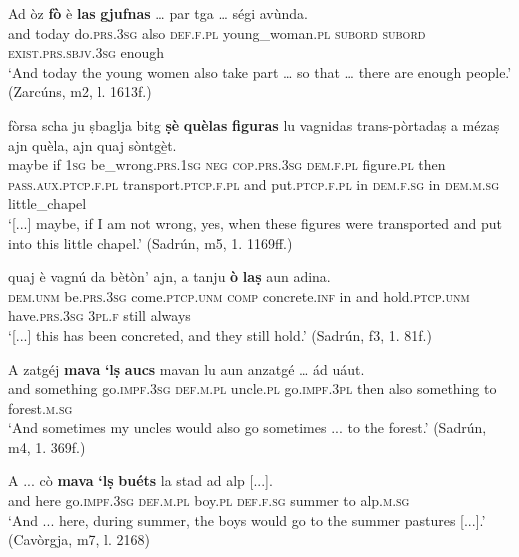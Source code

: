 \ea
\label{ex:3sg:e}
\gll    Ad òz \textbf{fò} è \textbf{las} \textbf{gjufnas} … par tga … ségi avùnda.\\
and today do.\textsc{prs.3sg} also  \textsc{def.f.pl} young\_woman.\textsc{pl} {} \textsc{subord} \textsc{subord} {} \textsc{exist.prs.sbjv.3sg} enough\\
\glt `And today the young women also take part … so that … there are enough people.' (Zarcúns, m2, l. 1613f.)
\z

\ea
\label{ex:subjsing9}
\gll  [...] fòrsa scha ju ṣbaglja bitg \textbf{ṣè} \textbf{quèlas} \textbf{figuras} lu vagnidas trans-pòrtadaṣ a mézaṣ ajn quèla, ajn quaj sòntgè̱t.\\
{} maybe if \textsc{1sg} be\_wrong.\textsc{prs.1sg} \textsc{neg} \textsc{cop.prs.3sg} \textsc{dem.f.pl} figure.\textsc{pl} then \textsc{pass.aux.ptcp.f.pl} transport.\textsc{ptcp.f.pl} and put.\textsc{ptcp.f.pl} in \textsc{dem.f.sg} in \textsc{dem.m.sg} little\_chapel\\
\glt `[...] maybe, if I am not wrong, yes, when these figures were transported and put into this little chapel.' (Sadrún, m5, 1. 1169ff.)
\z

\ea
\label{ex:subjsing10}
\gll  [...] quaj è vagnú da bètòn’ ajn, a tanju \textbf{ò} \textbf{laṣ} aun adina. \\
{} \textsc{dem.unm} be.\textsc{prs.3sg} come.\textsc{ptcp.unm} \textsc{comp} concrete.\textsc{inf} in and hold.\textsc{ptcp.unm} have.\textsc{prs.3sg} \textsc{3pl.f} still always \\
\glt `[...] this has been concreted, and they still hold.' (Sadrún, f3, 1. 81f.)
\z

\ea
\label{ex:subjsing11}
\gll   A zatgéj \textbf{mava} \textbf{`lṣ} \textbf{aucs} mavan lu aun anzatgé … ád uáut.\\
and something go.\textsc{impf.3sg}  \textsc{def.m.pl} uncle.\textsc{pl}  go.\textsc{impf.3pl} then also something {} to forest.\textsc{m.sg} \\
\glt `And sometimes my uncles would also go sometimes ... to the forest.' (Sadrún, m4, 1. 369f.)
\z

\ea
\label{ex:subjsing12}
\gll  A ... cò \textbf{mava} \textbf{`lṣ} \textbf{buéts} la stad ad alp [...].  \\
and {} here go.\textsc{impf.3sg} \textsc{def.m.pl} boy.\textsc{pl} \textsc{def.f.sg} summer to alp.\textsc{m.sg}\\
\glt `And ... here, during summer, the boys would go to the summer pastures [...].' (Cavòrgja, m7, l. 2168)
\z
 

